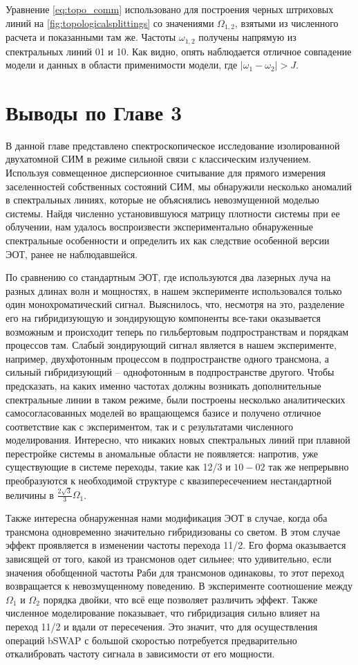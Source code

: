 \documentclass[14pt, a4paper]{extreport}
\numberwithin{equation}{section}
\begin{document}
Уравнение \eqref{eq:topo_comm} использовано для построения черных штриховых линий на \autoref{fig:topologicalsplittings} со значениями $\Omega_{1,2}$, взятыми из численного расчета и показанными там же. Частоты $\omega_{1,2}$ получены напрямую из спектральных линий 01 и 10. Как видно, опять наблюдается отличное совпадение модели и данных в области применимости модели, где $|\omega_1 - \omega_2|>J$.

\section{Выводы по Главе 3}

В данной главе представлено спектроскопическое исследование изолированной двухатомной СИМ в режиме сильной связи с классическим излучением. Используя совмещенное дисперсионное считывание для прямого измерения заселенностей собственных состояний СИМ, мы обнаружили несколько аномалий в спектральных линиях, которые не объяснялись невозмущенной моделью системы. Найдя численно установившуюся матрицу плотности системы при ее облучении, нам удалось воспроизвести экспериментально обнаруженные спектральные особенности и определить их как следствие особенной версии ЭОТ, ранее не наблюдавшейся.

По сравнению со стандартным ЭОТ, где используются два лазерных луча на разных длинах волн и мощностях, в нашем эксперименте использовался только один монохроматический сигнал. Выяснилось, что, несмотря на это, разделение его на гибридизующую и зондирующую компоненты все-таки оказывается возможным и происходит теперь по гильбертовым подпространствам и порядкам процессов там. Слабый зондирующий сигнал является в нашем эксперименте, например, двухфотонным процессом в подпространстве одного трансмона, а сильный гибридизующий -- однофотонным в подпространстве другого. Чтобы предсказать, на каких именно частотах должны возникать дополнительные спектральные линии в таком режиме, были построены несколько аналитических самосогласованных моделей во вращающемся базисе и получено отличное соответствие как с экспериментом, так и с результатами численного моделирования. Интересно, что никаких новых спектральных линий при плавной перестройке системы в аномальные области не появляется: напротив, уже существующие в системе переходы, такие как 12/3 и $10-02$  так же непрерывно преобразуются к необходимой структуре с квазипересечением нестандартной величины в $\frac{2\sqrt{3}}{3}\Omega_1$. 

Также интересна обнаруженная нами модификация ЭОТ в случае, когда оба трансмона одновременно значительно гибридизованы со светом. В этом случае эффект проявляется в изменении частоты перехода 11/2. Его форма оказывается зависящей от того, какой из трансмонов одет сильнее; что удивительно, если значения обобщенной частоты Раби для трансмонов одинаковы, то этот переход возвращается к невозмущенному поведению. В эксперименте соотношение между $\Omega_1$ и $\Omega_2$ порядка двойки, что всё еще позволяет различить эффект. Также численное моделирование показывает, что гибридизация сильно влияет на переход 11/2 и вдали от пересечения. Это значит, что для осуществления операций bSWAP с большой скоростью потребуется предварительно откалибровать частоту сигнала в зависимости от его мощности.
\end{document}
